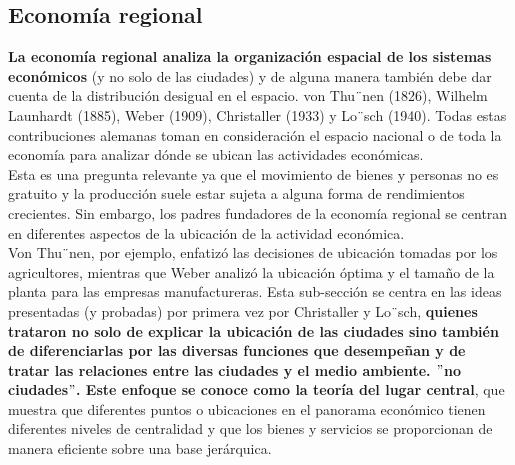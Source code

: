 \subsection{Economía regional}
\textbf{La economía regional analiza la organización espacial de los sistemas económicos} (y no solo de las ciudades) y de alguna manera también debe dar cuenta de la distribución desigual en el espacio. von Thu¨nen (1826), Wilhelm Launhardt (1885), Weber (1909), Christaller (1933) y Lo¨sch (1940). Todas estas contribuciones alemanas toman en consideración el espacio nacional o de toda la economía para analizar dónde se ubican las actividades económicas. \\
Esta es una pregunta relevante ya que el movimiento de bienes y personas no es gratuito y la producción suele estar sujeta a alguna forma de rendimientos crecientes. Sin embargo, los padres fundadores de la economía regional se centran en diferentes aspectos de la ubicación de la actividad económica.\\
Von Thu¨nen, por ejemplo, enfatizó las decisiones de ubicación tomadas por los agricultores, mientras que Weber analizó la ubicación óptima y el tamaño de la planta para las empresas manufactureras. Esta sub-sección se centra en las ideas presentadas (y probadas) por primera vez por Christaller y Lo¨sch, \textbf{quienes trataron no solo de explicar la ubicación de las ciudades sino también de diferenciarlas por las diversas funciones que desempeñan y de tratar las relaciones entre las ciudades y el medio ambiente. $"$no ciudades$"$. Este enfoque se conoce como la teoría del lugar central}, que muestra que diferentes puntos o ubicaciones en el panorama económico tienen diferentes niveles de centralidad y que los bienes y servicios se proporcionan de manera eficiente sobre una base jerárquica.

